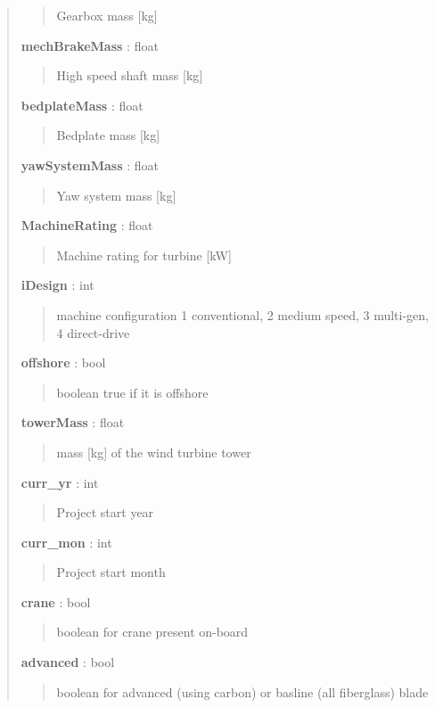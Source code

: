 \documentclass[letterpaper,10pt,openany,oneside]{sphinxmanual}
\begin{document}
\begin{fulllineitems}
\begin{quote}
\begin{description}
\begin{quote}
Gearbox mass {[}kg{]}
\end{quote}

\textbf{mechBrakeMass} : float
\begin{quote}

High speed shaft mass {[}kg{]}
\end{quote}

\textbf{bedplateMass} : float
\begin{quote}

Bedplate mass {[}kg{]}
\end{quote}

\textbf{yawSystemMass} : float
\begin{quote}

Yaw system mass {[}kg{]}
\end{quote}

\textbf{MachineRating} : float
\begin{quote}

Machine rating for turbine {[}kW{]}
\end{quote}

\textbf{iDesign} : int
\begin{quote}

machine configuration 1 conventional, 2 medium speed, 3 multi-gen, 4 direct-drive
\end{quote}

\textbf{offshore} : bool
\begin{quote}

boolean true if it is offshore
\end{quote}

\textbf{towerMass} : float
\begin{quote}

mass {[}kg{]} of the wind turbine tower
\end{quote}

\textbf{curr\_yr} : int
\begin{quote}

Project start year
\end{quote}

\textbf{curr\_mon} : int
\begin{quote}

Project start month
\end{quote}

\textbf{crane} : bool
\begin{quote}

boolean for crane present on-board
\end{quote}

\textbf{advanced} : bool
\begin{quote}

boolean for advanced (using carbon) or basline (all fiberglass) blade
\end{quote}

\end{description}\end{quote}

\end{fulllineitems}
\end{document}
